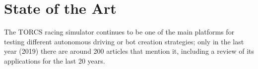\documentclass[10pt,journal,compsoc]{IEEEtran}
\begin{document}



\section{State of the Art}
\label{sec:soa}






The TORCS racing simulator continues to be one of the main platforms
for testing different autonomous driving or bot creation strategies;
only in the last year (2019) there are around 200 articles that
mention it, including a review \cite{schiavullo2019torcs} of its
applications for the last 20 years.
\end{document}
